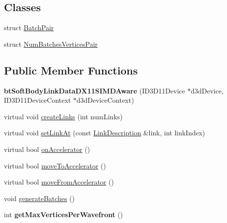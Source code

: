 \subsection*{Classes}
\begin{DoxyCompactItemize}
\item 
struct \hyperlink{structbtSoftBodyLinkDataDX11SIMDAware_1_1BatchPair}{Batch\+Pair}
\item 
struct \hyperlink{structbtSoftBodyLinkDataDX11SIMDAware_1_1NumBatchesVerticesPair}{Num\+Batches\+Vertices\+Pair}
\end{DoxyCompactItemize}
\subsection*{Public Member Functions}
\begin{DoxyCompactItemize}
\item 
\mbox{\label{classbtSoftBodyLinkDataDX11SIMDAware_a267670e3a238d94e2b8bc99b5a780beb}} 
{\bfseries bt\+Soft\+Body\+Link\+Data\+D\+X11\+S\+I\+M\+D\+Aware} (I\+D3\+D11\+Device $\ast$d3d\+Device, I\+D3\+D11\+Device\+Context $\ast$d3d\+Device\+Context)
\item 
virtual void \hyperlink{classbtSoftBodyLinkDataDX11SIMDAware_a8b3760b7e8393ad2ff03be02c8b91854}{create\+Links} (int num\+Links)
\item 
virtual void \hyperlink{classbtSoftBodyLinkDataDX11SIMDAware_aa8139528d8d1c83643b46e2e3a8a6b35}{set\+Link\+At} (const \hyperlink{classbtSoftBodyLinkData_1_1LinkDescription}{Link\+Description} \&link, int link\+Index)
\item 
virtual bool \hyperlink{classbtSoftBodyLinkDataDX11SIMDAware_acc8a4475c093d0caf3da6e104ad33f5d}{on\+Accelerator} ()
\item 
virtual bool \hyperlink{classbtSoftBodyLinkDataDX11SIMDAware_ab498ee8250262804abb96ee7f67cba29}{move\+To\+Accelerator} ()
\item 
virtual bool \hyperlink{classbtSoftBodyLinkDataDX11SIMDAware_a86ffcd3e1eae29d3a9019790d4172990}{move\+From\+Accelerator} ()
\item 
void \hyperlink{classbtSoftBodyLinkDataDX11SIMDAware_ac22f881862e6a2c2f7e57b8e50044827}{generate\+Batches} ()
\item 
\mbox{\label{classbtSoftBodyLinkDataDX11SIMDAware_a4bd59ce080fe45412bcba9e571ba7ec5}} 
int {\bfseries get\+Max\+Vertices\+Per\+Wavefront} ()

\end{DoxyCompactItemize}
